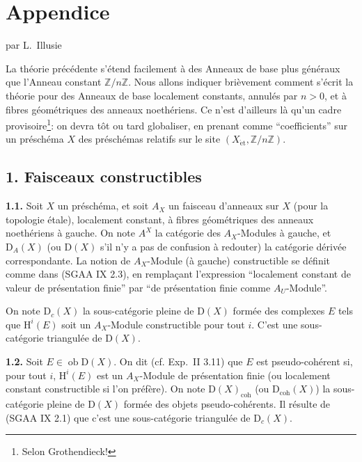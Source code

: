 \documentclass[11pt]{article}
\renewcommand{\H}{\mathrm{H}}
\newcommand{\D}{\mathrm{D}}
\newcommand{\Z}{\mathbb{Z}}
\newcommand{\ob}{\operatorname{ob}}
\providecommand{\ob}{\operatorname{ob}}
\begin{document}
\section*{Appendice}
\begin{center}
par L.~Illusie
\end{center}

La théorie précédente s'étend facilement à des Anneaux de base plus généraux que l'Anneau constant $\Z/n\Z$. Nous allons indiquer brièvement comment s'écrit la théorie pour des Anneaux de base localement constants, annulés par $n>0$, et à fibres géométriques des anneaux noethériens. Ce n'est d'ailleurs là qu'un cadre provisoire\footnote{Selon Grothendieck!}: on devra tôt ou tard globaliser, en prenant comme ``coefficients'' sur un préschéma $X$ des préschémas relatifs sur le site $(X_{\mathrm{\acute et}},\Z/n\Z)$.

\subsection*{1. Faisceaux constructibles}

\textbf{1.1.} Soit $X$ un préschéma, et soit $A_X$ un faisceau d'anneaux sur $X$ (pour la topologie étale), localement constant, à fibres géométriques des anneaux noethériens à gauche. On note $A^{X}$ la catégorie des $A_X$-Modules à gauche, et $\D_A(X)$ (ou $\D(X)$ s'il n'y a pas de confusion à redouter) la catégorie dérivée correspondante. La notion de $A_X$-Module (à gauche) constructible se définit comme dans (SGAA IX 2.3), en remplaçant l'expression ``localement constant de valeur de présentation finie'' par ``de présentation finie comme $A_U$-Module''.

On note $\D_c(X)$ la sous-catégorie pleine de $\D(X)$ formée des complexes $E$ tels que $\H^i(E)$ soit un $A_X$-Module constructible pour tout $i$. C'est une sous-catégorie triangulée de $\D(X)$.

\textbf{1.2.} Soit $E\in\ob\D(X)$. On dit (cf. Exp.~II 3.11) que $E$ est pseudo-cohérent si, pour tout $i$, $\H^i(E)$ est un $A_X$-Module de présentation finie (ou localement constant constructible si l'on préfère). On note $\D(X)_{\mathrm{coh}}$ (ou $\D_{\mathrm{coh}}(X)$) la sous-catégorie pleine de $\D(X)$ formée des objets pseudo-cohérents. Il résulte de (SGAA IX 2.1) que c'est une sous-catégorie triangulée de $\D_c(X)$.
\end{document}
